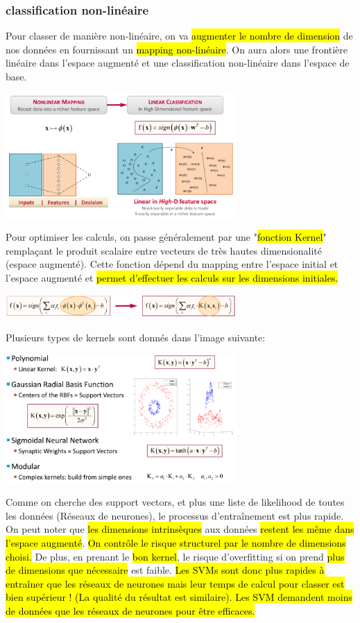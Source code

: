 \documentclass[letterpaper, 12pt]{article}
\newcommand{\alinea}{
\hspace*{0.5cm}}
\begin{document}
			\subsubsection{classification non-linéaire}
				\alinea Pour classer de manière non-linéaire, on va \hl{augmenter le nombre de dimension} de nos données en fournissant
					un \hl{mapping non-linéaire}. On aura alors une frontière linéaire dans l'espace augmenté et une classification 
					non-linéaire dans l'espace de base.
				\begin{center}
					\includegraphics[width=0.66\textwidth]{Images/svm3}
				\end{center}
				\alinea Pour optimiser les calculs, on passe généralement par une "\hl{fonction Kernel}" remplaçant le produit scalaire
					entre vecteurs de très hautes dimensionalité (espace augmenté). Cette fonction dépend du mapping entre l'espace
					initial et l'espace augmenté et \hl{permet d'effectuer les calculs sur les dimensions initiales.}
				\begin{center}
					\includegraphics[width=0.66\textwidth]{Images/svm4}
				\end{center}
				\alinea Plusieurs types de kernels sont donnés dans l'image suivante:
					\begin{center}
						\includegraphics[width=0.66\textwidth]{Images/kernels}
					\end{center}
				\alinea Comme on cherche des support vectors, et plus une liste de likelihood de toutes les données (Réseaux de neurones),
					le processus d'entraînement est plus rapide. On peut noter que \hl{les dimensions intrinsèques} aux données 
					\hl{restent les même dans l'espace augmenté}. \hl{On contrôle le risque structurel par le nombre de dimensions
					choisi.} De plus, en prenant le \hl{bon kernel}, le risque d'overfitting si on prend \hl{plus de dimensions que
					nécessaire} est faible. \hl{Les SVMs sont donc plus rapides à entraîner que les réseaux de neurones mais leur
					temps de calcul pour classer est bien supérieur ! (La qualité du résultat est similaire). Les SVM demandent
					moins de données que les réseaux de neurones pour être efficaces.}
\end{document}
